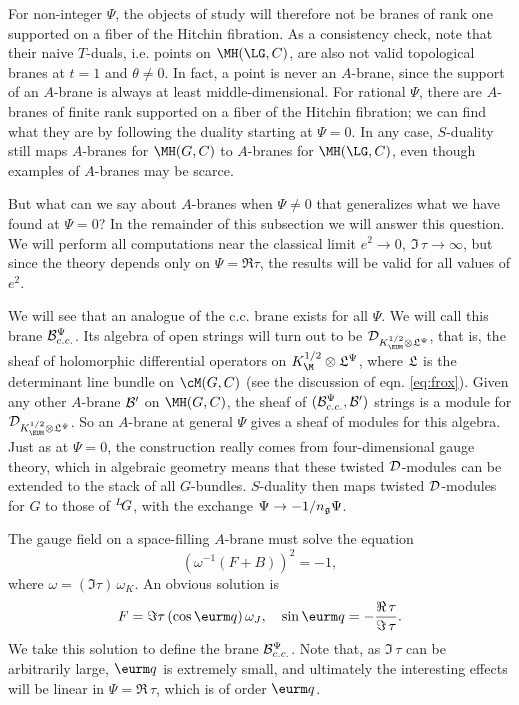 For non-integer $\Psi$, the objects of study will therefore not be
branes of rank one supported on a fiber of the Hitchin fibration.
 As a consistency check, note that their naive $T$-duals, i.e.
points on $\MH(\LG,C)$, are also not valid topological branes at
$t=1$ and $\theta\neq 0$.  In fact, a point is never an $A$-brane,
since the support of an $A$-brane is always at least
middle-dimensional.  For rational $\Psi$, there are $A$-branes of
finite rank supported on a fiber of the Hitchin fibration; we can
find what they are by following the duality starting at $\Psi=0$.
In any case, $S$-duality still maps  $A$-branes for $\MH(G,C)$ to
$A$-branes for $\MH(\LG,C)$, even though examples of $A$-branes
may be scarce.

But what can we say about $A$-branes when $\Psi\not=0$ that
generalizes what we have found at $\Psi=0$? In the remainder of
this subsection we will answer this question.
 We will perform all computations near the classical limit $e^2\to
0,\ \Im\,\tau\to \infty$, but since the theory depends only on
$\Psi=\Re\tau$, the results will be valid for all values of $e^2$.

We will see that an analogue of the c.c. brane exists for all
$\Psi$.  We will call this brane ${\cal B}_{c.c.}^\Psi$. Its
algebra of open strings will turn out to be ${\cal
D}_{K_{\EUM}^{1/2}\otimes {{{\frak L}}}^\Psi}$, that is, the sheaf
of holomorphic differential operators on $K_\M^{1/2}\otimes{\frak
L}^\Psi$, where ${\frak L}$ is the determinant line bundle on
$\cM(G,C)$ (see the discussion of eqn. \eqref{eq:frox}). Given any other
$A$-brane ${\cal B}'$ on $\MH(G,C)$, the sheaf of $({\cal
B}_{c.c.}^\Psi,{\cal B}')$ strings is a module for ${\cal D}_{K_{
\EUM}^{1/2}\otimes {{{\frak L}}}^\Psi}$.  So an $A$-brane at
general $\Psi$ gives a sheaf of modules for this algebra. Just as
at $\Psi=0$, the construction really comes from four-dimensional
gauge theory, which in algebraic geometry means that these twisted
${\cal D}$-modules can be extended to the stack of all
$G$-bundles. $S$-duality then maps  twisted ${\cal D}$-modules for
$G$ to those of  $^L\negthinspace G$, with the exchange $\Psi\to
-1/n_{\frak g}\Psi$.

The gauge field on a space-filling  $A$-brane must solve the
equation %
\setcounter{equation}{29}
\begin{equation}\label{eq:juko}
(\omega^{-1}(F+B))^2=-1,
\end{equation}
 where
$\omega=(\Im\tau)\, \omega_K$. An obvious solution is %
\setcounter{equation}{30}
\begin{equation}\label{eq:uko}
F=
\Im\tau\, (\cos{\eurm q})\, \omega_J,\quad \sin{\eurm q}=-{{\Re\,
\tau}\over {\Im\, \tau}}.
\end{equation}
  We take this solution to define the
brane ${\cal B}_{c.c.}^\Psi$.  Note that, as ${\Im\,\tau}$ can be
arbitrarily large, ${\eurm q}$ is extremely small, and ultimately
the interesting effects will be linear in $\Psi=\Re\,\tau$, which
is of order ${\eurm q}$.

